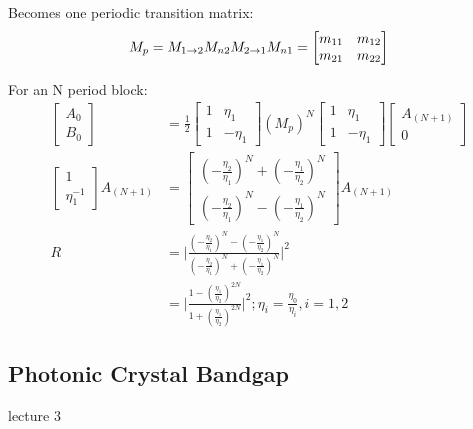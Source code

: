 Becomes one periodic transition matrix:
\begin{equation*}
	M_p = M_{1\rightarrow2}M_{n2}M_{2\rightarrow1}M_{n1} = \begin{bmatrix}m_{11} & m_{12}\\m_{21} & m_{22}\end{bmatrix}\\ 	
\end{equation*}

For an N period block:
\begin{equation*}
	\begin{aligned}
		\begin{bmatrix}A_0\\B_0 \end{bmatrix} 
		&=\frac{1}{2}\begin{bmatrix}1 & \eta_1\\1 & -\eta_1\end{bmatrix} 
		(M_p)^N 
		\begin{bmatrix}1 & \eta_1\\1 & -\eta_1\end{bmatrix}\begin{bmatrix}A_{(N+1)}\\0\end{bmatrix}\\
		\begin{bmatrix}1 \\\eta_1^{-1}\end{bmatrix}A_{(N+1)}
		&= \begin{bmatrix}(-\frac{\eta_2}{\eta_1})^N+(-\frac{\eta_1}{\eta_2})^N \\ (-\frac{\eta_2}{\eta_1})^N-(-\frac{\eta_1}{\eta_2})^N\end{bmatrix}A_{(N+1)}\\
		R &= \Bigg|\frac{(-\frac{\eta_2}{\eta_1})^N-(-\frac{\eta_1}{\eta_2})^N}{(-\frac{\eta_2}{\eta_1})^N+(-\frac{\eta_1}{\eta_2})^N}\Bigg|^2\\
		&=\Bigg|\frac{1-(\frac{\eta_1}{\eta_2})^{2N}}{1+(\frac{\eta_1}{\eta_2})^{2N}}\Bigg|^2; \eta_i = \frac{\eta_0}{\eta_i}, i = 1, 2
	\end{aligned}
\end{equation*}

\subsection{Photonic Crystal Bandgap}
lecture 3


